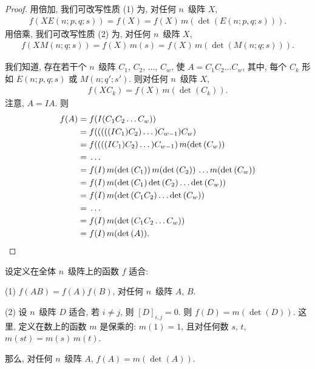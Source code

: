 \documentclass[../libro.tex]{subfiles}
\begin{document}
\begin{proof}
    用倍加, 我们可改写性质 (1) 为,
    对任何 \(n\)~级阵 \(X\),
    \begin{align*}
        f(X E(n; p, q; s))
        = f(X)
        = f(X)\, m(\det {(E(n; p, q; s))}).
    \end{align*}
    用倍乘, 我们可改写性质 (2) 为,
    对任何 \(n\)~级阵 \(X\),
    \begin{align*}
        f(X M(n; q; s))
        = f(X)\, m(s)
        = f(X)\, m(\det {(M(n; q; s))}).
    \end{align*}

    我们知道,
    存在若干个 \(n\)~级阵
    \(C_1\), \(C_2\), \(\dots\), \(C_w\),
    使 \(A = C_1 C_2 \dots C_w\),
    其中, 每个 \(C_k\) 形如
    \(E(n; p, q; s)\) 或 \(M(n; q'; s')\).
    则对任何 \(n\)~级阵 \(X\),
    \begin{align*}
        f(X C_k) = f(X)\, m(\det {(C_k)}).
    \end{align*}
    注意, \(A = I A\).
    则
    \begin{align*}
        f(A)
        = {} &
        f (I (C_1 C_2 \dots C_w))
        \\
        = {} &
        f (((((I C_1) C_2) \dots) C_{w-1}) C_w)
        \\
        = {} &
        f ((((I C_1) C_2) \dots) C_{w-1})\,
        m(\det {(C_w)})
        \\
        = {} &
        \dots
        \\
        = {} &
        f(I)\,
        m(\det {(C_1)})\,
        m(\det {(C_2)})\,
        \dots
        m(\det {(C_w)})
        \\
        = {} &
        f(I)\,
        m(\det {(C_1)} \det {(C_2)} \dots \det {(C_w)})
        \\
        = {} &
        f(I)\,
        m(\det {(C_1 C_2)} \dots \det {(C_w)})
        \\
        = {} &
        \dots
        \\
        = {} &
        f(I)\,
        m(\det {(C_1 C_2 \dots C_w)})
        \\
        = {} &
        f(I)\, m(\det {(A)}).
        \qedhere
    \end{align*}
\end{proof}

\begin{theorem}
    设定义在全体 \(n\)~级阵上的函数 \(f\) 适合:

    (1)
    \(f(A B) = f(A) f(B)\),
    对任何 \(n\)~级阵 \(A\), \(B\).

    (2)
    设 \(n\)~级阵 \(D\) 适合,
    若 \(i \neq j\), 则 \([D]_{i,j} = 0\).
    则 \(f(D) = m(\det {(D)})\).
    这里, 定义在数上的函数 \(m\) 是保乘的:
    \(m(1) = 1\),
    且对任何数 \(s\), \(t\), \(m(st) = m(s)\, m(t)\).

    那么, 对任何 \(n\)~级阵 \(A\),
    \(f(A) = m(\det {(A)})\).
\end{theorem}
\end{document}
